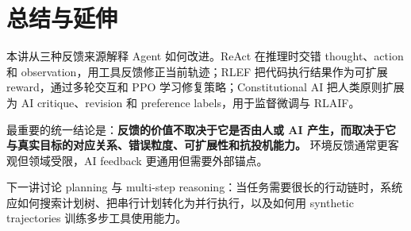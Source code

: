 \section{总结与延伸}

本讲从三种反馈来源解释 Agent 如何改进。ReAct 在推理时交错 thought、action 和 observation，用工具反馈修正当前轨迹；RLEF 把代码执行结果作为可扩展 reward，通过多轮交互和 PPO 学习修复策略；Constitutional AI 把人类原则扩展为 AI critique、revision 和 preference labels，用于监督微调与 RLAIF。

最重要的统一结论是：\textbf{反馈的价值不取决于它是否由人或 AI 产生，而取决于它与真实目标的对应关系、错误粒度、可扩展性和抗投机能力。} 环境反馈通常更客观但领域受限，AI feedback 更通用但需要外部锚点。

下一讲讨论 planning 与 multi-step reasoning：当任务需要很长的行动链时，系统应如何搜索计划树、把串行计划转化为并行执行，以及如何用 synthetic trajectories 训练多步工具使用能力。


